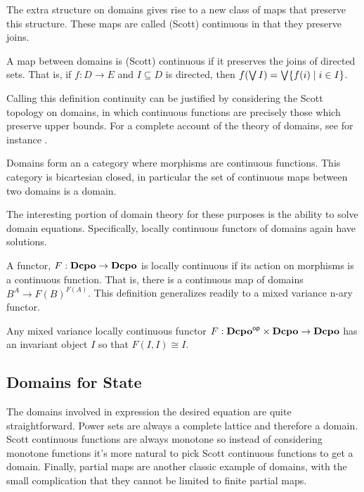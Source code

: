 The extra structure on domains gives rise to a new class of maps that
preserve this structure. These maps are called (Scott) continuous in
that they preserve joins.
\begin{defn}
  A map between domains is (Scott) continuous if it preserves the
  joins of directed sets. That is, if $f : D \to E$ and
  $I \subseteq D$ is directed, then
  $f(\bigvee I) = \bigvee \{f(i) \mid i \in I\}$.
\end{defn}
Calling this definition continuity can be justified by considering the
Scott topology on domains, in which continuous functions are precisely
those which preserve upper bounds. For a complete account of the
theory of domains, see for instance \citet{Girez:03,Abramsky:94}.
\begin{thm}
  Domains form an a category where morphisms are continuous
  functions. This category is bicartesian closed, in particular the
  set of continuous maps between two domains is a domain.
\end{thm}
The interesting portion of domain theory for these purposes is the
ability to solve domain equations. Specifically, locally continuous
functors of domains again have solutions.
\begin{defn}
  A functor, $F : \mathbf{Dcpo} \to \mathbf{Dcpo}$ is locally continuous if its action
  on morphisms is a continuous function. That is, there is a
  continuous map of domains $B^A \to F(B)^{F(A)}$. This definition
  generalizes readily to a mixed variance n-ary functor.
\end{defn}
\begin{thm}\label{thm:domains:fixed-points}
  Any mixed variance locally continuous functor
  $F : \mathbf{Dcpo}^{\mathsf{op}} \times \mathbf{Dcpo} \to \mathbf{Dcpo}$ has an invariant object $I$
  so that $F(I, I) \cong I$.
\end{thm}

\subsection{Domains for State}

The domains involved in expression the desired equation are quite
straightforward. Power sets are always a complete lattice and
therefore a domain. Scott continuous functions are always monotone so
instead of considering monotone functions it's more natural to pick
Scott continuous functions to get a domain. Finally, partial maps are
another classic example of domains, with the small complication that
they cannot be limited to finite partial maps.

